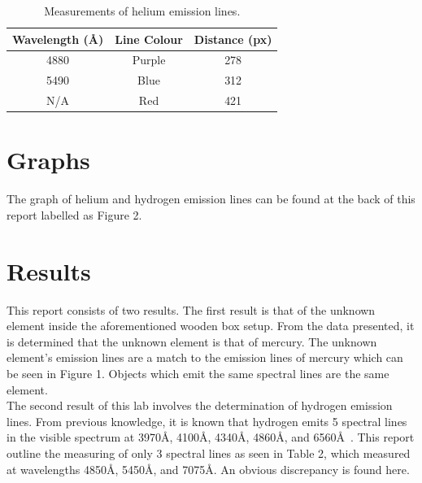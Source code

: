 \documentclass{article}
\begin{document}
\begin{table}[h]
\begin{center}
\begin{tabular}{c c c}
\hline
Wavelength (\AA) & Line Colour & Distance (px)\\
\hline
\hline
4880 & Purple & 278\\
5490 & Blue & 312\\
N/A & Red & 421\\
\hline
\end{tabular}
\end{center}
\caption{Measurements of helium emission lines.\label{tab:helium}}
\end{table}


\section{Graphs}

The graph of helium and hydrogen emission lines can be found at the back of this
report labelled as Figure 2.


\section{Results}

This report consists of two results. The first result is that of the unknown element
inside the aforementioned wooden box setup. From the data presented, it is determined
that the unknown element is that of mercury. The unknown element's emission lines are
a match to the emission lines of mercury which can be seen in Figure 1. Objects which
emit the same spectral lines are the same element.\\

The second result of this lab involves the determination of hydrogen emission lines.
From previous knowledge, it is known that hydrogen emits 5 spectral lines in the visible
spectrum at 3970\AA, 4100\AA, 4340\AA, 4860\AA, and 6560\AA~\cite{Balmer:1885}. 
This report outline the
measuring of only 3 spectral lines as seen in Table 2, which measured at wavelengths
4850\AA, 5450\AA, and 7075\AA. An obvious discrepancy is found here. \\
\end{document}
